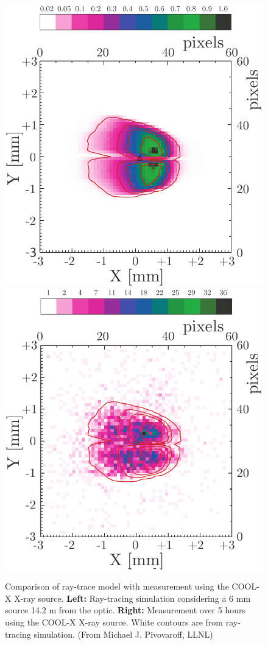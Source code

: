 \begin{figure}[htbp]
  \centering
    \includegraphics[width=0.47\linewidth]{figures/cast/coolX-simulation.pdf}
    \includegraphics[width=0.47\linewidth]{figures/cast/coolX-SRMM.pdf}
  \caption{\footnotesize Comparison of ray-trace model with measurement using the COOL-X X-ray source.  \textbf{Left:} Ray-tracing simulation considering a 6 mm source 14.2 m from the optic.  \textbf{Right:} Measurement over 5 hours using the COOL-X X-ray source. White contours are from ray-tracing simulation. (From Michael J. Pivovaroff, LLNL) }
  \label{fig:raytracing1}
\end{figure}

